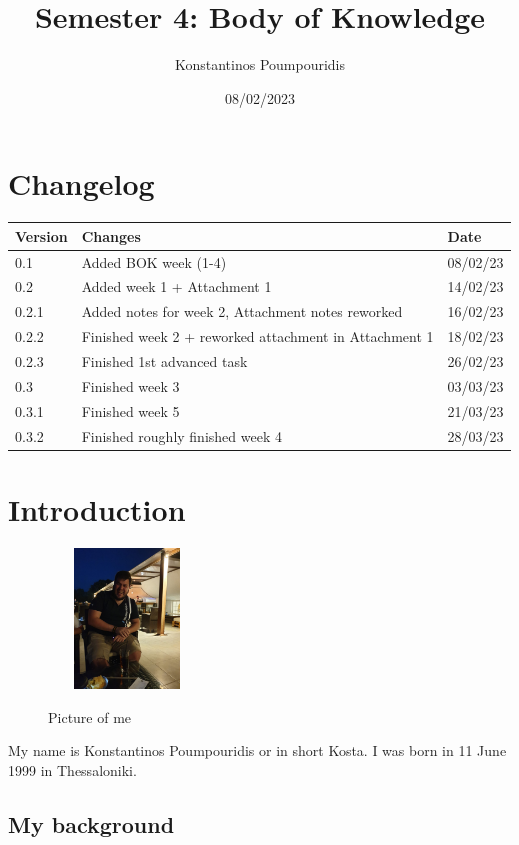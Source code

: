 \documentclass[12pt, letterpaper]{article}
\title{Semester 4: Body of Knowledge}
\author{Konstantinos Poumpouridis}
\date{08/02/2023}
\begin{document}
\maketitle
\thispagestyle{empty}
    
\newpage
\section{Changelog}
    \begin{table}[htbp]
        \begin{tabular}{|l|l|l|}
            \hline
            Version & Changes         & Date   \tabularnewline \hline
            0.1     & Added BOK week (1-4) & 08/02/23 \tabularnewline \hline
        0.2  &  Added week 1 + Attachment 1 & 14/02/23 \tabularnewline \hline
       0.2.1     &    Added notes for week 2, Attachment notes reworked     &  16/02/23      \tabularnewline \hline
       0.2.2  &  Finished week 2 + reworked attachment in Attachment 1 & 18/02/23 \tabularnewline \hline
       0.2.3  &  Finished 1st advanced task  & 26/02/23 \tabularnewline \hline
       0.3  &  Finished week 3  & 03/03/23 \tabularnewline \hline
        0.3.1  &  Finished week 5  & 21/03/23 \tabularnewline \hline
        0.3.2  &  Finished roughly finished week 4  & 28/03/23 \tabularnewline \hline
        \end{tabular}
    \end{table}
\newpage
\tableofcontents
\newpage
\section{Introduction}
\begin{figure}
    \includegraphics[width=0.25\textwidth]{fotos/Kosta.jpeg}
    \caption{Picture of me}
\end{figure}
My name is Konstantinos Poumpouridis or in short Kosta. I was born in 11 June 1999 in Thessaloniki.

\subsection{My background}
\end{document}
